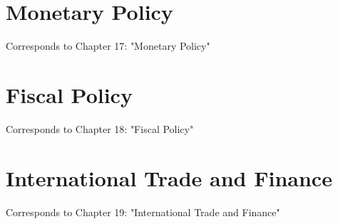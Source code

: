 \documentclass[12pt, a4paper]{article}
\theoremstyle{definition}
\begin{document}
\newpage

\section{Monetary Policy}
Corresponds to Chapter 17: "Monetary Policy"

\newpage

\section{Fiscal Policy}
Corresponds to Chapter 18: "Fiscal Policy"

\newpage

\section{International Trade and Finance}
Corresponds to Chapter 19: "International Trade and Finance"

\newpage
\end{document}
